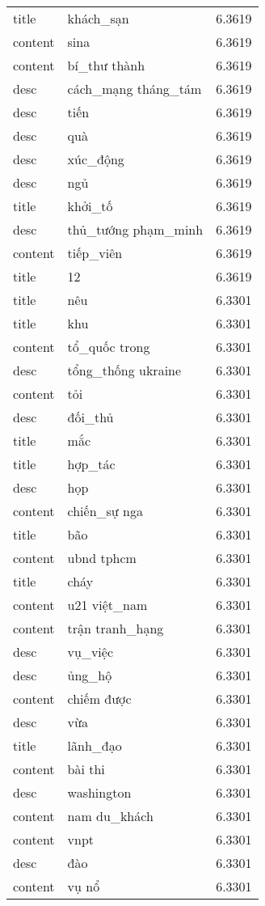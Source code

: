 \documentclass{article}
\begin{document}
\begin{tabular}{lll}
title & khách\_sạn & 6.3619\\
content & sina & 6.3619\\
content & bí\_thư thành & 6.3619\\
desc & cách\_mạng tháng\_tám & 6.3619\\
desc & tiến & 6.3619\\
desc & quà & 6.3619\\
desc & xúc\_động & 6.3619\\
desc & ngủ & 6.3619\\
title & khởi\_tố & 6.3619\\
desc & thủ\_tướng phạm\_minh & 6.3619\\
content & tiếp\_viên & 6.3619\\
title & 12 & 6.3619\\
title & nêu & 6.3301\\
title & khu & 6.3301\\
content & tổ\_quốc trong & 6.3301\\
desc & tổng\_thống ukraine & 6.3301\\
content & tỏi & 6.3301\\
desc & đối\_thủ & 6.3301\\
title & mắc & 6.3301\\
title & hợp\_tác & 6.3301\\
desc & họp & 6.3301\\
content & chiến\_sự nga & 6.3301\\
title & bão & 6.3301\\
content & ubnd tphcm & 6.3301\\
title & cháy & 6.3301\\
content & u21 việt\_nam & 6.3301\\
content & trận tranh\_hạng & 6.3301\\
desc & vụ\_việc & 6.3301\\
desc & ủng\_hộ & 6.3301\\
content & chiếm được & 6.3301\\
desc & vừa & 6.3301\\
title & lãnh\_đạo & 6.3301\\
content & bài thi & 6.3301\\
desc & washington & 6.3301\\
content & nam du\_khách & 6.3301\\
content & vnpt & 6.3301\\
desc & đào & 6.3301\\
content & vụ nổ & 6.3301\\

\end{tabular}
\end{document}
